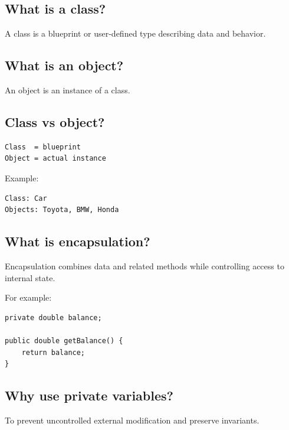 \medskip

\subsection{What is a class?}

A class is a blueprint or user-defined type describing data and behavior.

\medskip

\subsection{What is an object?}

An object is an instance of a class.

\medskip

\subsection{Class vs object?}

\begin{lstlisting}
Class  = blueprint
Object = actual instance
\end{lstlisting}

Example:

\begin{lstlisting}
Class: Car
Objects: Toyota, BMW, Honda
\end{lstlisting}

\medskip

\subsection{What is encapsulation?}

Encapsulation combines data and related methods while controlling access to internal state.

For example:

\begin{lstlisting}
private double balance;

public double getBalance() {
    return balance;
}
\end{lstlisting}

\medskip

\subsection{Why use private variables?}

To prevent uncontrolled external modification and preserve invariants.

